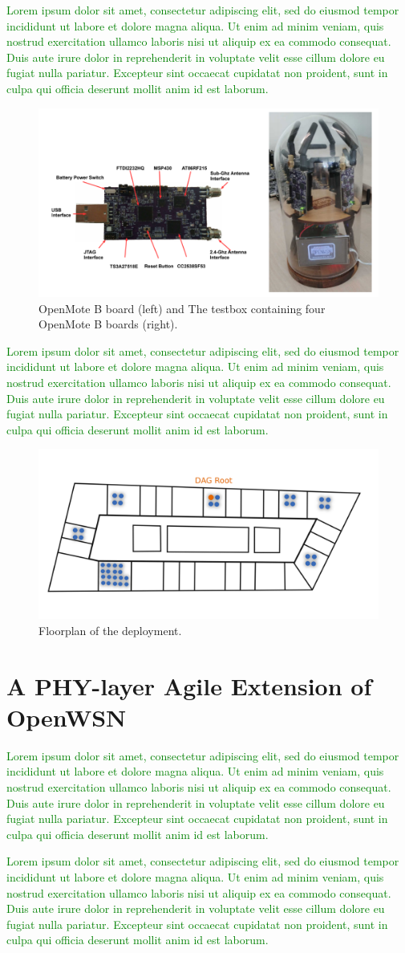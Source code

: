 \documentclass[journal]{IEEEtran}
\newcommand{\lorem}        {\textcolor{green}{Lorem ipsum dolor sit amet, consectetur adipiscing elit, sed do eiusmod tempor incididunt ut labore et dolore magna aliqua. Ut enim ad minim veniam, quis nostrud exercitation ullamco laboris nisi ut aliquip ex ea commodo consequat. Duis aute irure dolor in reprehenderit in voluptate velit esse cillum dolore eu fugiat nulla pariatur. Excepteur sint occaecat cupidatat non proident, sunt in culpa qui officia deserunt mollit anim id est laborum.}}
\begin{document}

\lorem

\begin{figure}
	\centering
	\includegraphics[width=0.90\columnwidth]{mote_ot}
	\caption{OpenMote B board (left) and The testbox containing four OpenMote B boards (right).}
    \label{fig:testbox}
\end{figure}


\lorem

\begin{figure}
	\centering
	\includegraphics[width=0.90\columnwidth]{building_motes}
	\caption{Floorplan of the deployment.}
    \label{fig:floorplan}
\end{figure}

\section{A PHY-layer Agile Extension of OpenWSN}
\label{sec:openwsn}


\lorem


\lorem
\end{document}
